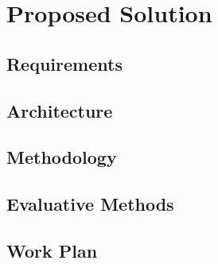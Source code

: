 \chapter{Proposed Solution} \label{chap:proposed-solution}

\section{Requirements}

\section{Architecture}

\section{Methodology}

\section{Evaluative Methods}

\section{Work Plan}

